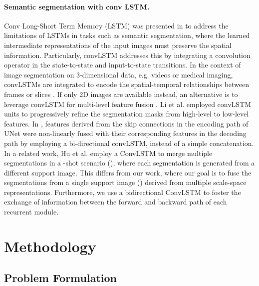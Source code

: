 \documentclass[runningheads]{llncs}
\begin{document}
\paragraph{\textbf{Semantic segmentation with conv LSTM.}}  










Conv Long-Short Term Memory (LSTM) was presented in \cite{xingjian2015convolutional} to address the limitations of LSTMs in tasks such as semantic segmentation, where the learned intermediate representations of the input images must preserve the spatial information. Particularly, convLSTM addresses this by integrating a convolution operator in the state-to-state and input-to-state transitions. In the context of image segmentation on 3-dimensional data, e.g. videos or medical imaging, convLSTMs are integrated to encode the spatial-temporal relationships between frames or slices \cite{chen2016combining,valipour2017recurrent,Song_2018_ECCV,zhang2018multi}. If only 2D images are available instead, an alternative is to leverage convLSTM for multi-level feature fusion \cite{li2018referring,azad2019bi}. Li et al. \cite{li2018referring} employed convLSTM units to progressively refine the segmentation masks from high-level to low-level features. In \cite{azad2019bi}, features derived from the skip connections in the encoding path of UNet \cite{ronneberger2015u} were non-linearly fused with their corresponding features in the decoding path by employing a bi-directional convLSTM, instead of a simple concatenation. In a related work, Hu et al. \cite{hu2019attention} employ a ConvLSTM to merge multiple segmentations in a -shot scenario (), where each segmentation is generated from a different support image. This differs from our work, where our goal is to fuse the segmentations from a single support image () derived from multiple scale-space representations. Furthermore, we use a bidirectional ConvLSTM to foster the exchange of information between the forward and backward path of each recurrent module.








\section{Methodology}


\subsection{Problem Formulation}
\end{document}
